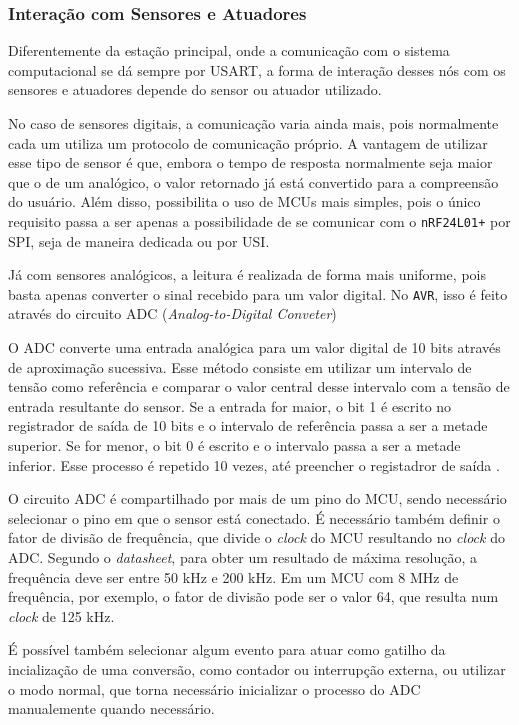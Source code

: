 \subsubsection{Interação com Sensores e Atuadores}
Diferentemente da estação principal, onde a comunicação com o sistema computacional se dá sempre por USART, a
forma de interação desses nós com os sensores e atuadores depende do sensor ou atuador utilizado.

No caso de sensores digitais, a comunicação varia ainda mais, pois normalmente cada um utiliza um protocolo de
comunicação próprio. A vantagem de utilizar esse tipo de sensor é que, embora o tempo de resposta normalmente
seja maior que o de um analógico, o valor retornado já está convertido para a compreensão do usuário. Além
disso, possibilita o uso de MCUs mais simples, pois o único requisito passa a ser apenas a possibilidade de se
comunicar com o \texttt{nRF24L01+} por SPI, seja de maneira dedicada ou por USI.

Já com sensores analógicos, a leitura é realizada de forma mais uniforme, pois basta apenas converter o sinal
recebido para um valor digital. No \texttt{AVR}, isso é feito através do circuito ADC (\textit{Analog-to-Digital
Conveter})

O ADC converte uma entrada analógica para um valor digital de 10 bits através de aproximação sucessiva. Esse
método consiste em utilizar um intervalo de tensão como referência e comparar o valor central desse intervalo
com a tensão de entrada resultante do sensor. Se a entrada for maior, o bit 1 é escrito no registrador de
saída de 10 bits e o intervalo de referência passa a ser a metade superior. Se for menor, o bit 0 é escrito e
o intervalo passa a ser a metade inferior. Esse processo é repetido 10 vezes, até preencher o registadror de
saída \cite{williams2014}.

O circuito ADC é compartilhado por mais de um pino do MCU, sendo necessário selecionar o pino em que o sensor
está conectado. É necessário também definir o fator de divisão de frequência, que divide o \textit{clock} do
MCU resultando no \textit{clock} do ADC. Segundo o \textit{datasheet}, para obter um resultado de máxima
resolução, a frequência deve ser entre 50 kHz e 200 kHz. Em um MCU com 8 MHz de frequência, por exemplo, o
fator de divisão pode ser o valor 64, que resulta num \textit{clock} de 125 kHz.

É possível também selecionar algum evento para atuar como gatilho da incialização de uma conversão, como
contador ou interrupção externa, ou utilizar o modo normal, que torna necessário inicializar o processo do ADC
manualemente quando necessário.

